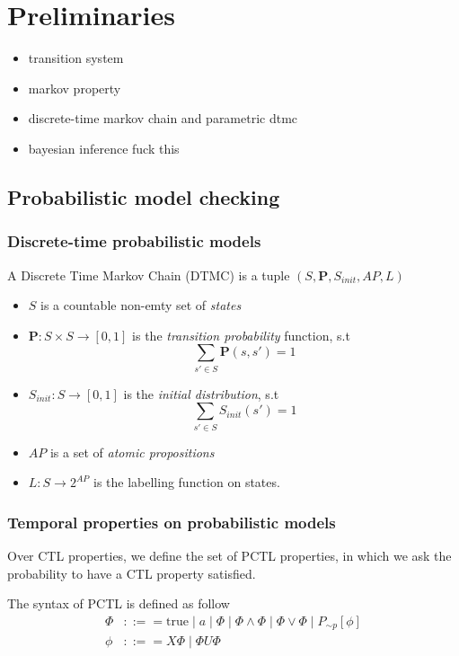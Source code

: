 \chapter{Preliminaries}
 {\color{red}
  \begin{itemize}
      \item transition system
      \item markov property
      \item discrete-time markov chain and parametric dtmc
      \item bayesian inference fuck this
  \end{itemize}
 }

\section{Probabilistic model checking}
\subsection{Discrete-time probabilistic models}
\begin{definition}
    A Discrete Time Markov Chain (DTMC) is a tuple $(S,\mathbf{P}, S_{init}, AP,
        L)$ \cite{baier2008principles}
    \begin{itemize}
        \item $S$ is a countable non-emty set of \textit{states}
        \item $\mathbf{P}:S\times S \rightarrow [0,1]$ is the \textit{transition probability}
              function, s.t $$\sum_{s'\in S}\mathbf{P}(s, s') = 1$$
        \item $S_{init}: S \rightarrow [0,1]$ is the \textit{initial distribution},
              s.t  $$\sum_{s'\in S}S_{init}(s') = 1$$
        \item $AP$ is a set of \textit{atomic propositions}
        \item $L: S \rightarrow 2^{AP}$ is the labelling function on states.
    \end{itemize}
\end{definition}


\subsection{Temporal properties on probabilistic models}
Over CTL properties, we define the set of PCTL properties, in which we ask the probability to have a CTL property satisfied.
\begin{definition} The syntax of PCTL is defined as follow
    \begin{align*}
        \Phi & ::== \text{true} \;|\; a \;|\; \Phi \;|\; \Phi \wedge \Phi \;|\; \Phi \vee \Phi \;|\;  P_{\sim  p}[\phi] \\
        \phi & ::== X\Phi \;|\; \Phi U \Phi
    \end{align*}
\end{definition}

